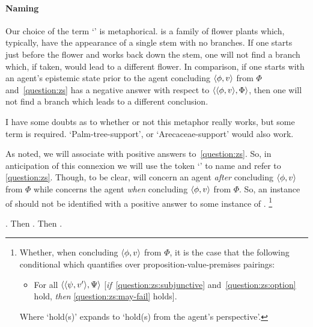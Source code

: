 \paragraph{Naming}

\begin{note}[Naming]
  Our choice of the term `' is metaphorical.
   is a family of flower plants which, typically, have the appearance of a single stem with no branches.
  If one starts just before the flower and works back down the stem, one will not find a branch which, if taken, would lead to a different flower.
  In comparison, if one starts with an agent's epistemic state prior to the agent concluding \(\langle \phi, v \rangle\) from \(\Phi\) and~\autoref{question:zs} has a negative answer with respect to \(\langle \langle \phi, v \rangle, \Phi \rangle\), then one will not find a branch which leads to a different conclusion.

  I have some doubts as to whether or not this metaphor really works, but some term is required.
  `Palm-tree-support', or `Arecaceae-support' would also work.
\end{note}

\begin{note}
  As {\color{red} noted}, we {\color{red} will} associate \zS{} with positive answers to~\autoref{question:zs}.
  So, in anticipation of this connexion we will use the token `\qzS{}' to name and refer to \autoref{question:zs}.
  Though, to be clear, \zS{} will concern an agent \emph{after} concluding \(\langle \phi, v \rangle\) from \(\Phi\) while \qzS{} concerns the agent \emph{when} concluding \(\langle \phi, v \rangle\) from \(\Phi\).
  So, an instance of \zS{} should not be identified with a positive answer to some instance of \qzS{}.%
  \footnote{
    Whether, when concluding \(\langle \phi, v \rangle\) from \(\Phi\), it is the case that the following conditional which quantifies over proposition-value-premises pairings:

    \begin{itemize}
    \item
      For all \(\langle \langle \psi, v' \rangle, \Psi \rangle\) [\emph{if}~\ref{question:zs:subjunctive} and~\ref{question:zs:option} hold, \emph{then} \ref{question:zs:may-fail} holds].
    \end{itemize}
    Where `hold(s)' expands to `hold(s) from the agent's perspective'.
  }
\end{note}



\begin{note}
  \qzS{}.
  Then \zS{}.
  Then \zetaS{}.
\end{note}

